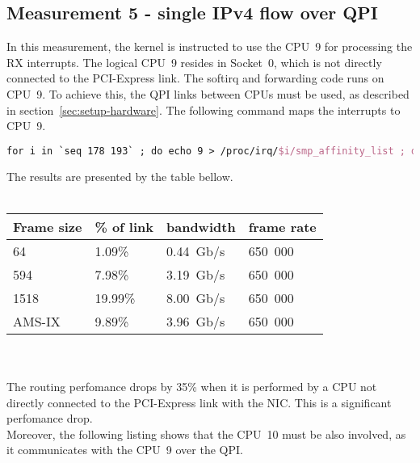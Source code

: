 
\subsection{Measurement 5 - single IPv4 flow over QPI}
In this measurement, the kernel is instructed to use the CPU~9 for processing the RX interrupts.
The logical CPU~9 resides in Socket~0, which is not directly connected to the PCI-Express link.
The softirq and forwarding code runs on CPU~9.
To achieve this, the QPI links between CPUs must be used, as described in section~\ref{sec:setup-hardware}.
The following command maps the interrupts to CPU~9.
\begin{lstlisting}[language=TeX]
for i in `seq 178 193` ; do echo 9 > /proc/irq/$i/smp_affinity_list ; done
\end{lstlisting}
The results are presented by the table bellow.
\\
\\
\begin{tabular}{ | l | l | l | l | }
\hline
Frame size & \% of link & bandwidth & frame rate \\
\hline
64     &  1.09\% &  0.44~Gb/s & 650~000 \\
594    &  7.98\% &  3.19~Gb/s & 650~000 \\
1518   & 19.99\% &  8.00~Gb/s & 650~000 \\
AMS-IX &  9.89\% &  3.96~Gb/s & 650~000 \\
\hline
\end{tabular}
\\
\\
The routing perfomance drops by 35\% when it is performed by
a CPU not directly connected to the PCI-Express link with the NIC.
This is a significant perfomance drop.
\\
Moreover, the following listing shows that the CPU~10 must be also involved, as
it communicates with the CPU~9 over the QPI.
